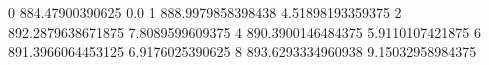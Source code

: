 0 884.47900390625 0.0
1 888.9979858398438 4.51898193359375
2 892.2879638671875 7.8089599609375
4 890.3900146484375 5.9110107421875
6 891.3966064453125 6.9176025390625
8 893.6293334960938 9.15032958984375
